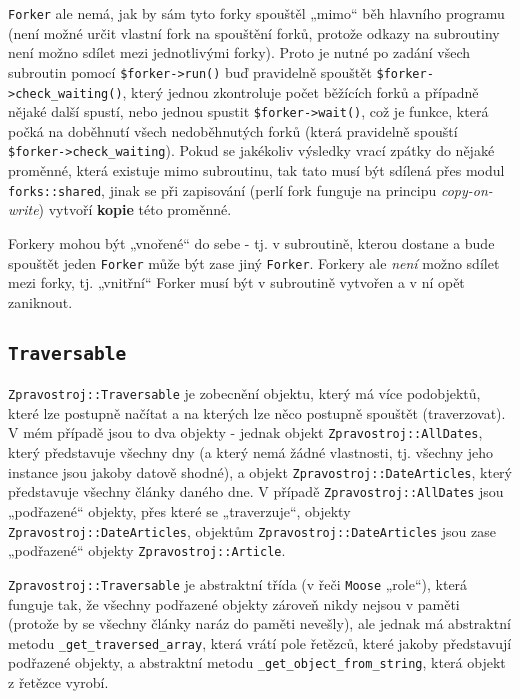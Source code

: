 \documentclass[12pt,a4paper]{report}
\def\uv#1{„#1“}
\begin{document}
\texttt{Forker} ale nemá, jak by sám tyto forky spouštěl \uv{mimo} běh hlavního programu (není možné určit vlastní fork na spouštění forků, protože odkazy na subroutiny není možno sdílet mezi jednotlivými forky). Proto je nutné po zadání všech subroutin pomocí \texttt{\$forker->run()} buď pravidelně spouštět \texttt{\$forker->check\_waiting()}, který jednou zkontroluje počet běžících forků a případně nějaké další spustí, nebo jednou spustit \texttt{\$forker->wait()}, což je funkce, která počká na doběhnutí všech nedoběhnutých forků (která pravidelně spouští \texttt{\$forker->check\_waiting}). Pokud se jakékoliv výsledky vrací zpátky do nějaké proměnné, která existuje mimo subroutinu, tak tato musí být sdílená přes modul \texttt{forks::shared}, jinak se při zapisování (perlí fork funguje na principu \emph{copy-on-write}) vytvoří \textbf{kopie} této proměnné.

Forkery mohou být \uv{vnořené} do sebe - tj. v subroutině, kterou dostane a bude spouštět jeden \texttt{Forker} může být zase jiný \texttt{Forker}. Forkery ale \emph{není} možno sdílet mezi forky, tj. \uv{vnitřní} Forker musí být v subroutině vytvořen a v ní opět zaniknout. 

\subsection{\texttt{Traversable}}

\texttt{Zpravostroj::Traversable} je zobecnění objektu, který má více podobjektů, které lze postupně načítat a na kterých lze něco postupně spouštět (traverzovat). V mém případě jsou to dva objekty - jednak objekt \texttt{Zpravostroj::AllDates}, který představuje všechny dny (a který nemá žádné vlastnosti, tj. všechny jeho instance jsou jakoby datově shodné), a objekt \texttt{Zpravostroj::DateArticles}, který představuje všechny články daného dne. V případě \texttt{Zpravostroj::AllDates} jsou \uv{podřazené} objekty, přes které se \uv{traverzuje}, objekty \texttt{Zpravostroj::DateArticles}, objektům \texttt{Zpravostroj::DateArticles} jsou zase \uv{podřazené} objekty \texttt{Zpravostroj::Article}.

\texttt{Zpravostroj::Traversable} je abstraktní třída (v řeči \texttt{Moose} \uv{role}), která funguje tak, že všechny podřazené objekty zároveň nikdy nejsou v paměti (protože by se všechny články naráz do paměti nevešly), ale jednak má abstraktní metodu \texttt{\_get\_traversed\_array}, která vrátí pole řetězců, které jakoby představují podřazené objekty, a abstraktní metodu \texttt{\_get\_object\_from\_string}, která objekt z řetězce vyrobí.
\end{document}
